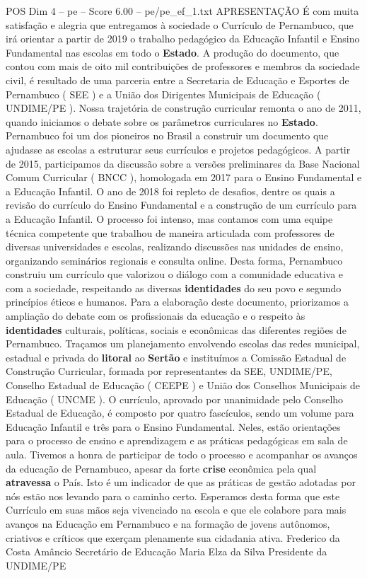 \begin{textsample}{POS Dim 4 – pe – Score 6.00 – pe/pe\_ef\_1.txt}  \label{ex:f4_pos_276}
APRESENTAÇÃO É com muita satisfação e alegria que entregamos à sociedade o Currículo de Pernambuco, que irá orientar a partir de 2019 o trabalho pedagógico da Educação Infantil e Ensino Fundamental nas escolas em todo o \textbf{Estado}.
A produção do documento, que contou com mais de oito mil contribuições de professores e membros da sociedade civil, é resultado de uma parceria entre a Secretaria de Educação e Esportes de Pernambuco ( SEE ) e a União dos Dirigentes Municipais de Educação ( UNDIME/PE ).
Nossa trajetória de construção curricular remonta o ano de 2011, quando iniciamos o debate sobre os parâmetros curriculares no \textbf{Estado}.
Pernambuco foi um dos pioneiros no Brasil a construir um documento que ajudasse as escolas a estruturar seus currículos e projetos pedagógicos.
A partir de 2015, participamos da discussão sobre a versões preliminares da Base Nacional Comum Curricular ( BNCC ), homologada em 2017 para o Ensino Fundamental e a Educação Infantil.
O ano de 2018 foi repleto de desafios, dentre os quais a revisão do currículo do Ensino Fundamental e a construção de um currículo para a Educação Infantil.
O processo foi intenso, mas contamos com uma equipe técnica competente que trabalhou de maneira articulada com professores de diversas universidades e escolas, realizando discussões nas unidades de ensino, organizando seminários regionais e consulta online.
Desta forma, Pernambuco construiu um currículo que valorizou o diálogo com a comunidade educativa e com a sociedade, respeitando as diversas \textbf{identidades} do seu povo e segundo princípios éticos e humanos.
Para a elaboração deste documento, priorizamos a ampliação do debate com os profissionais da educação e o respeito às \textbf{identidades} culturais, políticas, sociais e econômicas das diferentes regiões de Pernambuco.
Traçamos um planejamento envolvendo escolas das redes municipal, estadual e privada do \textbf{litoral} ao \textbf{Sertão} e instituímos a Comissão Estadual de Construção Curricular, formada por representantes da SEE, UNDIME/PE, Conselho Estadual de Educação ( CEEPE ) e União dos Conselhos Municipais de Educação ( UNCME ).
O currículo, aprovado por unanimidade pelo Conselho Estadual de Educação, é composto por quatro fascículos, sendo um volume para Educação Infantil e três para o Ensino Fundamental.
Neles, estão orientações para o processo de ensino e aprendizagem e as práticas pedagógicas em sala de aula.
Tivemos a honra de participar de todo o processo e acompanhar os avanços da educação de Pernambuco, apesar da forte \textbf{crise} econômica pela qual \textbf{atravessa} o País.
Isto é um indicador de que as práticas de gestão adotadas por nós estão nos levando para o caminho certo.
Esperamos desta forma que este Currículo em suas mãos seja vivenciado na escola e que ele colabore para mais avanços na Educação em Pernambuco e na formação de jovens autônomos, criativos e críticos que exerçam plenamente sua cidadania ativa.
Frederico da Costa Amâncio Secretário de Educação Maria Elza da Silva Presidente da UNDIME/PE

\end{textsample}
